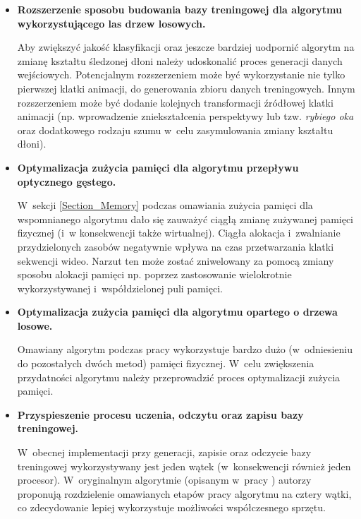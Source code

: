     \begin{itemize}
      \item \textbf{Rozszerzenie sposobu budowania bazy treningowej dla algorytmu wykorzystującego las drzew losowych.}

      Aby zwiększyć jakość klasyfikacji oraz jeszcze bardziej uodpornić algorytm na zmianę kształtu śledzonej dłoni należy udoskonalić proces generacji danych wejściowych. Potencjalnym rozszerzeniem może być wykorzystanie nie tylko pierwszej klatki animacji, do generowania zbioru danych treningowych. Innym rozszerzeniem może być dodanie kolejnych transformacji źródłowej klatki animacji (np. wprowadzenie zniekształcenia perspektywy lub tzw. \textit{rybiego oka} oraz dodatkowego rodzaju szumu w~celu zasymulowania zmiany kształtu dłoni).

      \item \textbf{Optymalizacja zużycia pamięci dla algorytmu przepływu optycznego gęstego.}

      W~sekcji \ref{Section_Memory} podczas omawiania zużycia pamięci dla wspomnianego algorytmu dało się zauważyć ciągłą zmianę zużywanej pamięci fizycznej (i~w konsekwencji także wirtualnej). Ciągła alokacja i~zwalnianie przydzielonych zasobów negatywnie wpływa na czas przetwarzania klatki sekwencji wideo. Narzut ten może zostać zniwelowany za pomocą zmiany sposobu alokacji pamięci np. poprzez zastosowanie wielokrotnie wykorzystywanej i~współdzielonej puli pamięci.

      \item \textbf{Optymalizacja zużycia pamięci dla algorytmu opartego o drzewa losowe.}

      Omawiany algorytm podczas pracy wykorzystuje bardzo dużo (w~odniesieniu do pozostałych dwóch metod) pamięci fizycznej. W~celu zwiększenia przydatności algorytmu należy przeprowadzić proces optymalizacji zużycia pamięci.

      \item \textbf{Przyspieszenie procesu uczenia, odczytu oraz zapisu bazy treningowej.}

       W~obecnej implementacji przy generacji, zapisie oraz odczycie bazy treningowej wykorzystywany jest jeden wątek (w~konsekwencji również jeden procesor). W~oryginalnym algorytmie (opisanym w~pracy \cite{RandomizedTrees06}) autorzy proponują rozdzielenie omawianych etapów pracy algorytmu na cztery wątki, co zdecydowanie lepiej wykorzystuje możliwości współczesnego sprzętu.
    \end{itemize}

